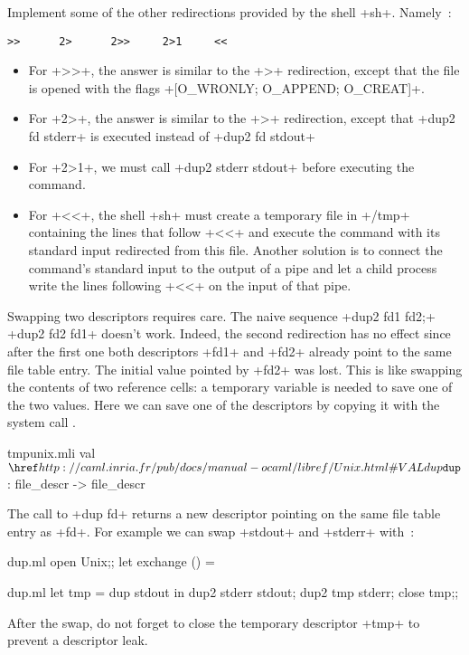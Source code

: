 \begin{exercise}
Implement some of the other redirections provided by the shell
\ml+sh+. Namely~: 
%
\begin{lstlisting}
>>      2>      2>>     2>1     <<
\end{lstlisting}
%
\end{exercise}
\begin{answer}
\begin{itemize}
\item For \ml+>>+, the answer is similar to the \ml+>+ redirection, except that the
file  is opened with the flags \ml+[O_WRONLY; O_APPEND; O_CREAT]+.
%
\item For \ml+2>+, the answer is similar to the \ml+>+ redirection, except that
\ml+dup2 fd stderr+ is executed instead of \ml+dup2 fd stdout+
%
\item For \ml+2>1+, we must call \ml+dup2 stderr stdout+ before executing
the command.
%
\item For \ml+<<+, the shell \ml+sh+ must create a temporary file in
\ml+/tmp+ containing the lines that follow \ml+<<+ and execute the 
command with its standard input redirected from this file. Another 
solution is to connect the command's standard input to the output of a 
pipe and let a child process write the lines following \ml+<<+ on the
input of that pipe.
\end{itemize}
\end{answer}

Swapping two descriptors requires care. The naive sequence
\ml+dup2 fd1 fd2;+ \ml+dup2 fd2 fd1+ doesn't work. Indeed, the second
redirection has no effect since after the first one both descriptors
\ml+fd1+ and \ml+fd2+ already point to the same file table entry.  The
initial value pointed by \ml+fd2+ was lost. This is like swapping the
contents of two reference cells: a temporary variable is needed to
save one of the two values. Here we can save one of the
descriptors by copying it with the system call .
%
\begin{listingcodefile}{tmpunix.mli}
val $\libvalue{Unix}{dup}$ : file_descr -> file_descr
\end{listingcodefile}
%
The call to \ml+dup fd+ returns a new descriptor pointing on the same
file table entry as \ml+fd+. For example we can swap \ml+stdout+ and 
\ml+stderr+ with~:
%
\begin{codefile}{dup.ml}
open Unix;;
let exchange () = 
\end{codefile}
%
\begin{listingcodefile}{dup.ml}
let tmp = dup stdout in
dup2 stderr stdout; 
dup2 tmp stderr;
close tmp;;
\end{listingcodefile}
% 
After the swap, do not forget to close the temporary descriptor
\ml+tmp+ to prevent a descriptor leak.

